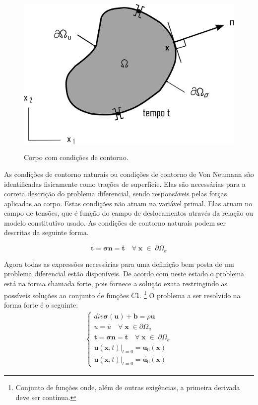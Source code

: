 \begin{figure}
	\caption{Corpo com condições de contorno.}
	\includegraphics{images/CorpoCondCont.png}
	\label{fig:condcont}
\end{figure}

As condições de contorno naturais ou condições de contorno de Von Neumann são identificadas fisicamente como trações de superfície. Elas são necessárias para a correta descrição do problema diferencial, sendo responsáveis pelas forças aplicadas ao corpo. Estas condições não atuam na variável primal. Elas atuam no campo de tensões, que é função do campo de deslocamentos através da relação ou modelo constitutivo usado. As condições de contorno naturais podem ser descritas da seguinte forma.

\begin{equation}
	\boldsymbol{t} = \boldsymbol{\sigma}\boldsymbol{n} = \boldsymbol{\overline{t}} \quad \forall \; \boldsymbol{x} \; \in \; \partial \Omega_{\sigma}
\end{equation}

Agora todas as expressões necessárias para uma definição bem posta de um problema diferencial estão disponíveis. De acordo com \cite{Paulo} neste estado o problema está na forma chamada forte, pois fornece a solução exata restringindo as possíveis soluções ao conjunto de funções $C1$. \footnote{Conjunto de funções onde, além de outras exigências, a primeira derivada deve ser contínua.} O problema a ser resolvido na forma forte é o seguinte:
\begin{align}
    \begin{cases}
	div\boldsymbol{\sigma(\boldsymbol{u})} + \boldsymbol{b} = \rho \ddot{\boldsymbol{u}}\\
	u = \overline{u} \quad \forall \; \boldsymbol{x} \; \in  \partial \Omega_u\\
	\boldsymbol{t} = \boldsymbol{\sigma}\boldsymbol{n} = \boldsymbol{\overline{t}} \quad \forall \; \boldsymbol{x} \; \in \; \partial \Omega_{\sigma} \\
	\boldsymbol{u}(\boldsymbol{x},t)|_{t=0} = \boldsymbol{u}_{0}(\boldsymbol{x}) \\
	\dot{\boldsymbol{u}}(\boldsymbol{x},t)|_{t=0} = \dot{\boldsymbol{u}_{0}}(\boldsymbol{x})
	\end{cases}
\end{align}

